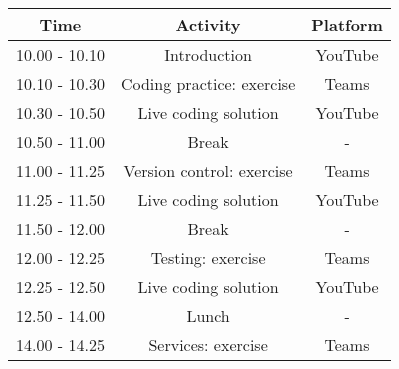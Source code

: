 \documentclass{article}
\begin{document}
\begin{table}[h!]

    \centering \begin{tabular}{c|c|c}
         
         Time & Activity & Platform  \\ 
         
         \hline 
         
         10.00 - 10.10 & Introduction & YouTube \\ 
         
         \hline 
         
         10.10 - 10.30 & Coding practice: exercise & Teams \\ 
         
         \hline 
         
         10.30 - 10.50 & Live coding solution & YouTube \\ 
         
         \hline 
         
         10.50 - 11.00 & Break & - \\ 
         
         \hline 
         
         11.00 - 11.25 & Version control: exercise & Teams \\ 
         
         \hline 
         
         11.25 - 11.50 & Live coding solution & YouTube \\ 
         
         \hline 
         
         11.50 - 12.00 & Break & - \\ 
         
         \hline 
         
         12.00 - 12.25 & Testing: exercise & Teams \\
         
         \hline 
         
         12.25 - 12.50 & Live coding solution & YouTube \\ 
         
         \hline
         
         12.50 - 14.00 & Lunch & - \\ 
         
         \hline 
         
         14.00 - 14.25 & Services: exercise & Teams \\ 
         

\end{tabular}
\end{table}
\end{document}
